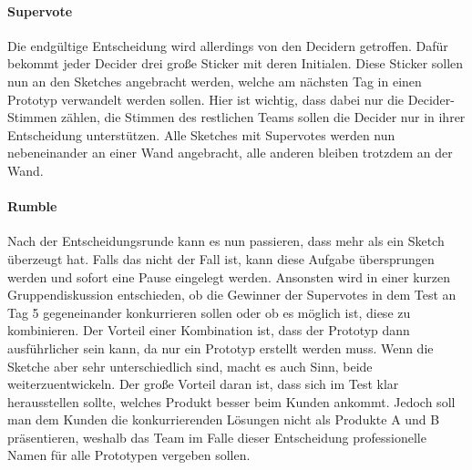 \paragraph{Supervote}
Die endgültige Entscheidung wird allerdings von den Decidern getroffen. Dafür bekommt jeder Decider drei große Sticker mit deren Initialen. Diese Sticker sollen nun an den Sketches angebracht werden, welche am nächsten Tag in einen Prototyp verwandelt werden sollen. Hier ist wichtig, dass dabei nur die Decider-Stimmen zählen, die Stimmen des restlichen Teams sollen die Decider nur in ihrer Entscheidung unterstützen. Alle Sketches mit Supervotes werden nun nebeneinander an einer Wand angebracht, alle anderen bleiben trotzdem an der Wand.

\paragraph{Rumble}
Nach der Entscheidungsrunde kann es nun passieren, dass mehr als ein Sketch überzeugt hat. Falls das nicht der Fall ist, kann diese Aufgabe übersprungen werden und sofort eine Pause eingelegt werden. Ansonsten wird in einer kurzen Gruppendiskussion entschieden, ob die Gewinner der Supervotes in dem Test an Tag 5 gegeneinander konkurrieren sollen oder ob es möglich ist, diese zu kombinieren. Der Vorteil einer Kombination ist, dass der Prototyp dann ausführlicher sein kann, da nur ein Prototyp erstellt werden muss. Wenn die Sketche aber sehr unterschiedlich sind, macht es auch Sinn, beide weiterzuentwickeln. Der große Vorteil daran ist, dass sich im Test klar herausstellen sollte, welches Produkt besser beim Kunden ankommt. Jedoch soll man dem Kunden die konkurrierenden Lösungen nicht als Produkte A und B präsentieren, weshalb das Team im Falle dieser Entscheidung professionelle Namen für alle Prototypen vergeben sollen. 

